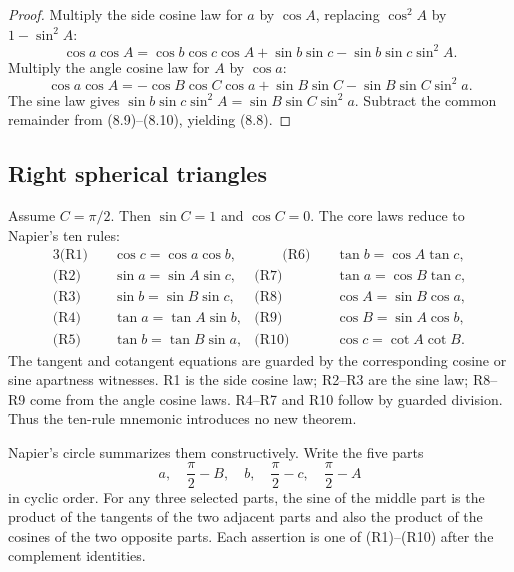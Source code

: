 \begin{proof}
Multiply the side cosine law for \(a\) by \(\cos A\), replacing
\(\cos^2A\) by \(1-\sin^2A\):
\begin{equation}
 \cos a\cos A
 =\cos b\cos c\cos A+\sin b\sin c
  -\sin b\sin c\sin^2A.                                   \tag{8.9}
\end{equation}
Multiply the angle cosine law for \(A\) by \(\cos a\):
\begin{equation}
 \cos a\cos A
 =-\cos B\cos C\cos a+\sin B\sin C
  -\sin B\sin C\sin^2a.                                  \tag{8.10}
\end{equation}
The sine law gives
\(
 \sin b\sin c\sin^2A=\sin B\sin C\sin^2a
\).
Subtract the common remainder from (8.9)--(8.10), yielding (8.8).
\end{proof}

\subsection{Right spherical triangles}

Assume \(C=\pi/2\).  Then \(\sin C=1\) and \(\cos C=0\).  The core laws reduce
to Napier's ten rules:
\begin{alignat}{3}
 \text{(R1)}\quad&\cos c=\cos a\cos b,
 &\qquad \text{(R6)}\quad&\tan b=\cos A\tan c,             \tag{8.11}\\
 \text{(R2)}\quad&\sin a=\sin A\sin c,
 &\text{(R7)}\quad&\tan a=\cos B\tan c,                  \tag{8.12}\\
 \text{(R3)}\quad&\sin b=\sin B\sin c,
 &\text{(R8)}\quad&\cos A=\sin B\cos a,                  \tag{8.13}\\
 \text{(R4)}\quad&\tan a=\tan A\sin b,
 &\text{(R9)}\quad&\cos B=\sin A\cos b,                  \tag{8.14}\\
 \text{(R5)}\quad&\tan b=\tan B\sin a,
 &\text{(R10)}\quad&\cos c=\cot A\cot B.                 \tag{8.15}
\end{alignat}
The tangent and cotangent equations are guarded by the corresponding cosine or
sine apartness witnesses.  R1 is the side cosine law; R2--R3 are the sine law;
R8--R9 come from the angle cosine laws.  R4--R7 and R10 follow by guarded
division.  Thus the ten-rule mnemonic introduces no new theorem.

Napier's circle summarizes them constructively.  Write the five parts
\[
 a,\quad \frac\pi2-B,\quad b,\quad \frac\pi2-c,\quad \frac\pi2-A
\]
in cyclic order.  For any three selected parts, the sine of the middle part is
the product of the tangents of the two adjacent parts and also the product of
the cosines of the two opposite parts.  Each assertion is one of
(R1)--(R10) after the complement identities.

